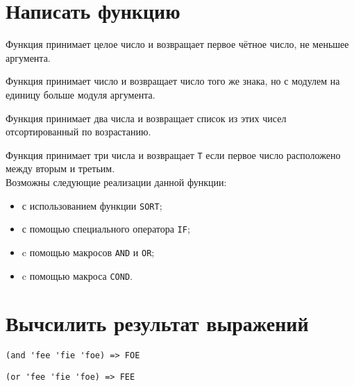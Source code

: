 
\section{Написать функцию}

\problem Функция принимает целое число и возвращает первое чётное число, не меньшее аргумента.



\problem Функция принимает число и возвращает число того же знака, но с модулем на единицу больше модуля аргумента.



\problem Функция принимает два числа и возвращает список из этих чисел отсортированный по возрастанию.



\problem Функция принимает три числа и возвращает \verb|T| если первое число расположено между вторым и третьим.\\

\noindent
Возможны следующие реализации данной функции:
\begin{itemize}
	\item с использованием функции \verb|SORT|;
	
	\item с помощью специального оператора \verb|IF|;
	
	\item c помощью макросов \verb|AND| и \verb|OR|;
	
	\item c помощью макроса \verb|COND|.
\end{itemize}




\section{Вычсилить результат выражений}

\problem \hfill
\begin{lstlisting}
(and 'fee 'fie 'foe) => FOE
\end{lstlisting}


\problem \hfill
\begin{lstlisting}
(or 'fee 'fie 'foe) => FEE
\end{lstlisting}


